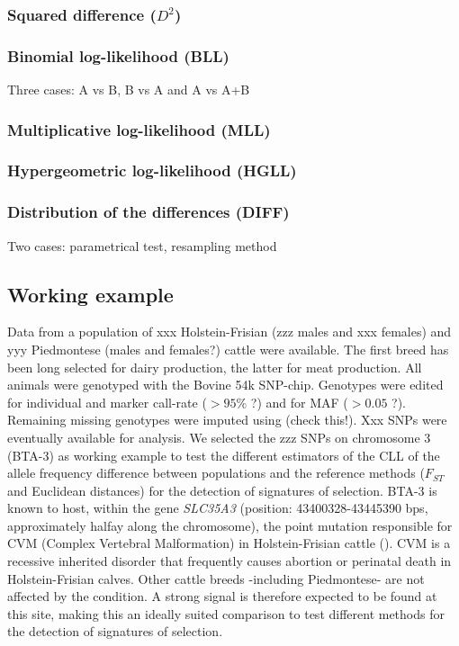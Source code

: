 \documentclass{bmcart}
\begin{document}
\subsubsection*{Squared difference ($D^2$)}

\subsubsection*{Binomial log-likelihood (BLL)}
Three cases: A vs B, B vs A and A vs A+B

\subsubsection*{Multiplicative log-likelihood (MLL)}
\subsubsection*{Hypergeometric log-likelihood (HGLL)}
\subsubsection*{Distribution of the differences (DIFF)}
Two cases: parametrical test, resampling method

\subsection*{Working example}

Data from a population of xxx Holstein-Frisian (zzz males and xxx
females) and yyy Piedmontese (males and females?)
cattle were available. The first breed has been long selected for dairy
production, the latter for meat production. All animals were genotyped
with the Bovine 54k SNP-chip. Genotypes were edited for individual and
marker call-rate ($>95\%$ ?) and for MAF ($>0.05$ ?). Remaining missing
genotypes were imputed using (check this!). Xxx SNPs were eventually
available for analysis. We selected the zzz SNPs on chromosome 3 (BTA-3) as
working example to test the different estimators of the CLL of the
allele frequency difference between populations and the reference
methods ($F_{ST}$ and Euclidean distances) for the detection of
signatures of selection.
BTA-3 is known to host, within the gene \emph{SLC35A3} (position:
43400328-43445390 bps, approximately halfay along the chromosome), the point mutation responsible for CVM (Complex
Vertebral Malformation) in Holstein-Frisian cattle (\cite{thomsen2006missense}).  
CVM is a recessive inherited disorder that frequently causes abortion or perinatal
death in Holstein-Frisian calves. Other cattle breeds -including Piedmontese- are not affected by
the condition. A strong signal is therefore expected to be found at this
site, making this an ideally suited comparison to test different methods
for the detection of signatures of selection.
\end{document}
